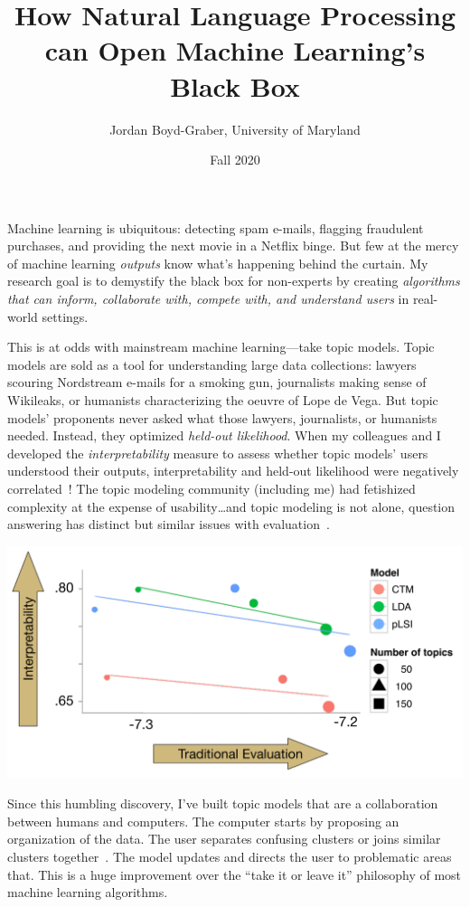 \documentclass[11pt]{amsart}
\begin{document}
 \title{How Natural Language Processing can Open Machine Learning's Black Box}

 \author{Jordan Boyd-Graber, University of Maryland}


\date{Fall 2020}

\maketitle

Machine learning is ubiquitous: detecting spam e-mails, flagging fraudulent
purchases, and providing the next movie in a Netflix binge.  But few at
the mercy of machine learning \emph{outputs} know what's happening behind the
curtain.  My research goal is to demystify the black box for non-experts by
creating \emph{algorithms that can inform, collaborate with, compete with, and
  understand users} in real-world settings.

This is at odds with mainstream machine learning---take topic models.  Topic
models are sold as a tool for understanding large data collections: lawyers
scouring Nordstream e-mails for a smoking gun, journalists making sense of Wikileaks,
or humanists characterizing the oeuvre of Lope de Vega.  But topic models'
proponents never asked what those lawyers, journalists, or humanists
needed. Instead, they optimized \emph{held-out likelihood}. When my colleagues
and I developed the \emph{interpretability} measure to assess whether topic
models' users understood their outputs, interpretability and
held-out likelihood were negatively correlated~\cite{chang-09b}! The topic
modeling community (including me) had fetishized complexity at the expense of
usability\dots and topic modeling is not alone, question answering has distinct but similar issues with evaluation~\cite{boyd-graber-20}.

\begin{center}
\includegraphics[width=.5\linewidth]{images/prec_ll_4}
\end{center}

Since this humbling discovery, I've built topic models that are a collaboration
between humans and computers.  The computer starts by proposing an organization
of the data.  The user separates confusing clusters or joins
similar clusters together~\cite{hu-14:itm}.  The model updates and directs the user to
problematic areas that.  This is a huge improvement over the
``take it or leave it'' philosophy of most machine learning algorithms.
\end{document}
